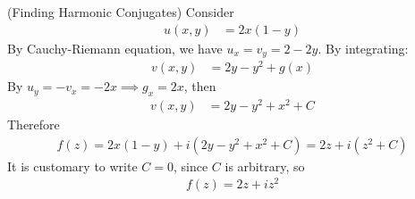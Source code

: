 \documentclass[12pt, english]{book}
\begin{document}
	\begin{example}(Finding Harmonic Conjugates)
		Consider 
		\begin{align*}
			u(x,y) &= 2x(1-y)
		\end{align*}
		By Cauchy-Riemann equation, we have \(u_x = v_y = 2-2y\). By integrating:
		\begin{align*}
			v(x,y) &= 2y - y^2 + g(x)
		\end{align*}
		By \(u_y = -v_x = -2x \implies g_x = 2x\), then
		\begin{align*}
			v(x,y) &= 2y - y^2 + x^2 + C
		\end{align*}
		Therefore
		\begin{align*}
			f(z) = 2x(1-y) + i(2y - y^2 + x^2 + C) = 2z + i(z^2 + C)
		\end{align*}
		It is customary to write \(C=0\), since \(C\) is arbitrary, so
		\begin{align*}
			f(z) = 2z + iz^2
		\end{align*}
	\end{example}
\end{document}
